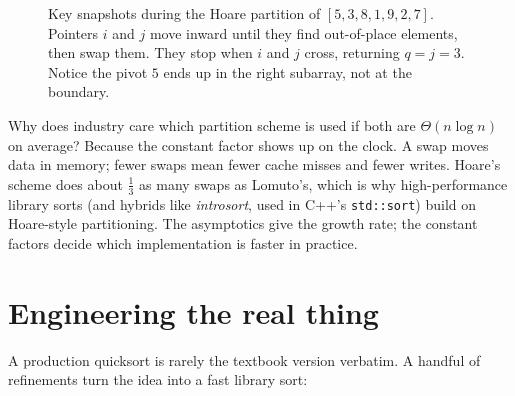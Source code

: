 \begin{figure}[h]
\caption{Key snapshots during the Hoare partition of $[5, 3, 8, 1, 9, 2, 7]$. Pointers $i$ and $j$ move inward until they find out-of-place elements, then swap them. They stop when $i$ and $j$ cross, returning $q=j=3$. Notice the pivot $5$ ends up in the right subarray, not at the boundary.}
\label{ch07:fig-hoare-trace}
\end{figure}

\begin{aestheticbox}
Why does industry care which partition scheme is used if both are
$\Theta(n \log n)$ on average? Because the constant factor shows up on the clock.
A swap moves data in memory; fewer swaps mean fewer cache misses and fewer writes.
Hoare's scheme does about $\frac{1}{3}$ as many swaps as Lomuto's, which is why
high-performance library sorts (and hybrids like \emph{introsort}, used in C++'s
\lstinline|std::sort|) build on Hoare-style partitioning. The asymptotics give
the growth rate; the constant factors decide which implementation is faster in practice.
\end{aestheticbox}

\section{Engineering the real thing}

A production quicksort is rarely the textbook version verbatim. A handful of
refinements turn the idea into a fast library sort:

